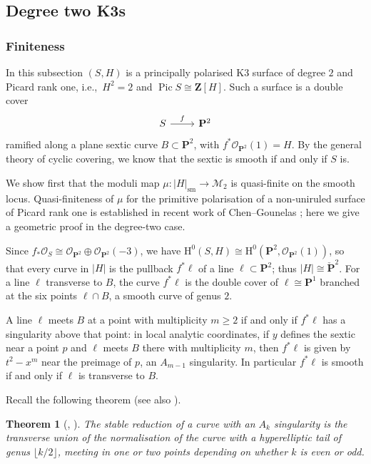 \documentclass[a4paper,12pt,twoside,reqno]{amsart}
\numberwithin{equation}{section}
\theoremstyle{plain}
\newtheorem{theorem}{Theorem}[section]
\theoremstyle{definition}
\DeclareMathOperator{\Pic}{Pic}
\newcommand{\PP}{\mathbf{P}}
\newcommand{\ZZ}{\mathbf{Z}}
\newcommand{\sm}{\mathrm{sm}}
\newcommand{\Pdual}{\check{\PP}^2}
\newcommand{\Mmod}{\mathscr{M}}
\newcommand{\HH}{\mathrm{H}}
\newcommand{\OO}{\mathscr{O}}
\theoremstyle{plain}
\theoremstyle{definition}
\begin{document}
\subsection{Degree two K3s}


\subsubsection{Finiteness}

In this subsection $(S,H)$ is a principally polarised K3 surface of degree $2$ and Picard rank one, i.e.,\ $H^2=2$ and $\Pic S\cong\ZZ[H]$. Such a surface is a double cover
\[
\begin{tikzcd}
S \arrow[r, "f"] & \PP^2
\end{tikzcd}
\]
ramified along a plane sextic curve $B\subset\PP^2$, with $f^*\OO_{\PP^2}(1)=H$. By the general theory of cyclic covering, we know that the sextic is smooth if and only if $S$ is.

We show first that the moduli map $\mu\colon|H|_{\sm}\to\Mmod_2$ is quasi-finite on the smooth locus. Quasi-finiteness of $\mu$ for the primitive polarisation of a non-uniruled surface of Picard rank one is established in recent work of Chen--Gounelas \cite{CG}; here we give a geometric proof in the degree-two case.



Since $f_*\OO_S\cong\OO_{\PP^2}\oplus\OO_{\PP^2}(-3)$, we have $\HH^0(S,H)\cong\HH^0(\PP^2,\OO_{\PP^2}(1))$, so that every curve in $|H|$ is the pullback $f^*\ell$ of a line $\ell\subset\PP^2$; thus $|H|\cong\Pdual$. For a line $\ell$ transverse to $B$, the curve $f^*\ell$ is the double cover of $\ell\cong\PP^1$ branched at the six points $\ell\cap B$, a smooth curve of genus $2$.

A line $\ell$ meets $B$ at a point with multiplicity $m\ge2$ if and only if $f^*\ell$ has a singularity above that point: in local analytic coordinates, if $y$ defines the sextic near a point $p$ and $\ell$ meets $B$ there with multiplicity $m$, then $f^*\ell$ is given by $t^2-x^m$ near the preimage of $p$, an $A_{m-1}$ singularity. In particular $f^*\ell$ is smooth if and only if $\ell$ is transverse to $B$.

Recall the following theorem (see also \cite[Theorem 10.2]{casalainamartin}).

\begin{theorem}[{\cite[\S6.2.1--6.2.2]{hassett00}, \cite[Example 4.1]{cml12}}]\label{thm:hassett}
    The stable reduction of a curve with an $A_k$ singularity is the transverse union of the normalisation of the curve with a hyperelliptic tail of genus $\lfloor k/2\rfloor$, meeting in one or two points depending on whether $k$ is even or odd.
\end{theorem}
\end{document}
